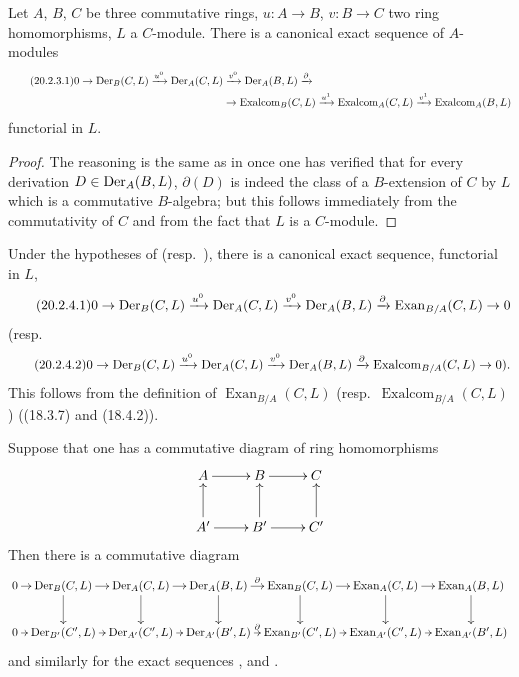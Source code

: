 \begin{corollary}[20.2.3]
\label{0.20.2.3}
Let $A$, $B$, $C$ be three commutative rings, $u:A\to B$, $v:B\to C$ two ring homomorphisms, $L$ a $C$-module.
There is a canonical exact sequence of $A$-modules
\begin{align}
\tag{20.2.3.1}
  \label{0.20.2.3.1}
  0\to\operatorname{Der}_B(C,L)\xrightarrow{u^0}\operatorname{Der}_A(C,L)&\xrightarrow{v^0}\operatorname{Der}_A(B,L)\xrightarrow{\partial} \\
  &\to\operatorname{Exalcom}_B(C,L)\xrightarrow{u^1}\operatorname{Exalcom}_A(C,L)\xrightarrow{v^1}\operatorname{Exalcom}_A(B,L) \notag
\end{align}
functorial in $L$.
\end{corollary}

\begin{proof}
The reasoning is the same as in  once one has verified that for every derivation $D\in\operatorname{Der}_A(B,L)$, $\partial(D)$ is indeed the class of a $B$-extension of $C$ by $L$ which is a commutative $B$-algebra; but this follows immediately from the commutativity of $C$ and from the fact that $L$ is a $C$-module.
\end{proof}

\begin{corollary}[20.2.4]
\label{0.20.2.4}
Under the hypotheses of  \textup{(}resp.\ \textup{)}, there is a canonical exact sequence, functorial in $L$,
\begin{equation}
\tag{20.2.4.1}
  \label{0.20.2.4.1}
  0\to\operatorname{Der}_B(C,L)\xrightarrow{u^0}\operatorname{Der}_A(C,L)\xrightarrow{v^0}\operatorname{Der}_A(B,L)\xrightarrow{\partial}\operatorname{Exan}_{B/A}(C,L)\to 0
\end{equation}
\textup{(}resp.
\begin{equation}
\tag{20.2.4.2}
  \label{0.20.2.4.2}
  0\to\operatorname{Der}_B(C,L)\xrightarrow{u^0}\operatorname{Der}_A(C,L)\xrightarrow{v^0}\operatorname{Der}_A(B,L)\xrightarrow{\partial}\operatorname{Exalcom}_{B/A}(C,L)\to 0\text{).}
\end{equation}
This follows from the definition of $\operatorname{Exan}_{B/A}(C,L)$ \textup{(}resp.\ $\operatorname{Exalcom}_{B/A}(C,L)$\textup{)} \textup{(}(18.3.7) and (18.4.2)\textup{)}.
\end{corollary}

\begin{remark}[20.2.5]
\label{0.20.2.5}
Suppose that one has a commutative diagram of ring homomorphisms
\[
\xymatrix{
  A \ar[r] & B \ar[r] & C \\
  A' \ar[u] \ar[r] & B' \ar[u] \ar[r] & C' \ar[u]
}
\]
Then there is a commutative diagram
\[
\xymatrix@C=0.5em{
  0 \ar[r] & \Der_B(C,L) \ar[r] \ar[d] & \Der_A(C,L) \ar[r] \ar[d] & \Der_A(B,L) \ar[r]^-\partial \ar[d] & \operatorname{Exan}_B(C,L) \ar[r] \ar[d] & \operatorname{Exan}_A(C,L) \ar[r] \ar[d] & \operatorname{Exan}_A(B,L) \ar[d] \\
  0 \ar[r] & \Der_{B'}(C',L) \ar[r] & \Der_{A'}(C',L) \ar[r] & \Der_{A'}(B',L) \ar[r]^-\partial & \operatorname{Exan}_{B'}(C',L) \ar[r] & \operatorname{Exan}_{A'}(C',L) \ar[r] & \operatorname{Exan}_{A'}(B',L)
}
\]
and similarly for the exact sequences ,  and .
\end{remark}

